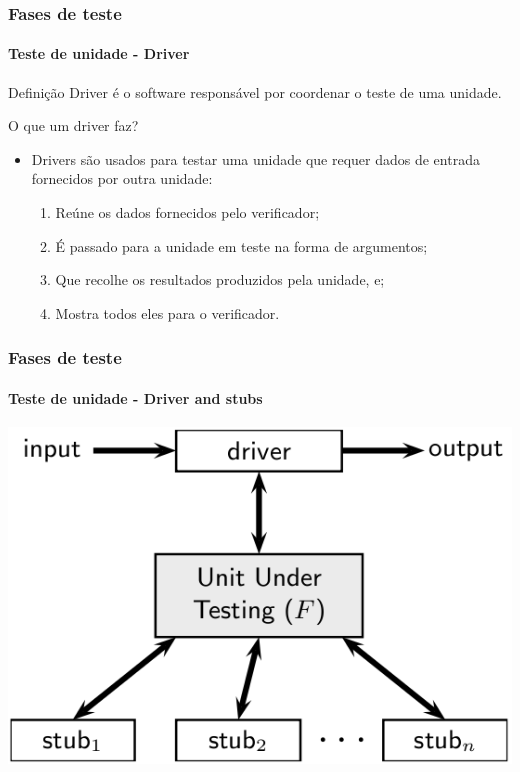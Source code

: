 \begin{frame}
\frametitle{Fases de teste}
\framesubtitle{Teste de unidade - Driver}
\label{concept:driver}
\label{concept:test-driver}

\begin{block:concept}{Definição}
Driver é o software responsável por coordenar o teste de uma unidade.
\end{block:concept}

\begin{block:fact}{O que um driver faz?}
\begin{itemize}
	\item Drivers são usados para testar uma unidade que requer dados de entrada fornecidos por outra unidade:
	\begin{enumerate}
		\item Reúne os dados fornecidos pelo verificador;
		\item É passado para a unidade em teste na forma de argumentos;
		\item Que recolhe os resultados produzidos pela unidade, e;
		\item Mostra todos eles para o verificador.
	\end{enumerate}
\end{itemize}
\end{block:fact}
\end{frame}


\begin{frame}[c]
\frametitle{Fases de teste}
\framesubtitle{Teste de unidade - Driver and stubs}

\begin{block:fact}{}
	\centering
	\includegraphics[scale=.3]{teste-de-software/conceitos-basicos/Imagens/driver-e-stub}
\end{block:fact}
\end{frame}




